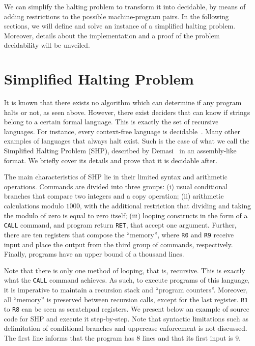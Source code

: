 \documentclass[12pt]{article}
\begin{document}
We can simplify the halting problem to transform it into decidable, by means of adding restrictions to the possible machine-program pairs. In the following sections, we will define and solve an instance of a simplified halting problem. Moreover, details about the implementation and a proof of the problem decidability will be unveiled.

\section{Simplified Halting Problem}\label{sec:halting}

It is known that there exists no algorithm which can determine if any program halts or not, as seen above. However, there exist deciders that can know if strings belong to a certain formal language. This is exactly the set of recursive languages. For instance, every context-free language is decidable~\cite[Theorem 4.9]{Sipser:book:2012}. Many other examples of languages that always halt exist. Such is the case of what we call the Simplified Halting Problem (SHP), described by Demasi~\cite{Demasi:misc:2013:may} in an assembly-like format. We briefly cover its details and prove that it is decidable after.

The main characteristics of SHP lie in their limited syntax and arithmetic operations. Commands are divided into three groups: (i) usual conditional branches that compare two integers and a copy operation; (ii) arithmetic calculations modulo $1000$, with the additional restriction that dividing and taking the modulo of zero is equal to zero itself; (iii) looping constructs in the form of a \texttt{CALL} command, and program return \texttt{RET}, that accept one argument. Further, there are ten registers that compose the ``memory'', where \texttt{R0} and \texttt{R9} receive input and place the output from the third group of commands, respectively. Finally, programs have an upper bound of a thousand lines.

Note that there is only one method of looping, that is, recursive. This is exactly what the \texttt{CALL} command achieves. As such, to execute programs of this language, it is imperative to maintain a recursion stack and ``program counters''. Moreover, all ``memory'' is preserved between recursion calls, except for the last register. \texttt{R1} to \texttt{R8} can be seen as scratchpad registers. We present below an example of source code for SHP and execute it step-by-step. Note that syntactic limitations such as delimitation of conditional branches and uppercase enforcement is not discussed. The first line informs that the program has $8$ lines and that its first input is $9$.
\end{document}
